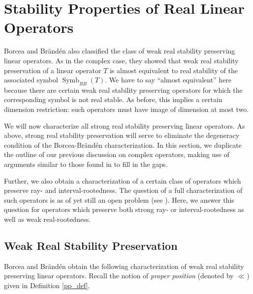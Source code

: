 \documentclass{article}
\theoremstyle{definition}
\theoremstyle{plain}
\DeclareMathOperator{\Symb}{Symb}
\begin{document}
\section{Stability Properties of Real Linear Operators}\label{Rops_sect}

Borcea and Br{\"a}nd{\'e}n also classified the class of weak real stability preserving linear operators. As in the complex case, they showed that weak real stability preservation of a linear operator $T$ is almost equivalent to real stability of the associated symbol $\Symb_{BB}(T)$. We have to say ``almost equivalent'' here because there are certain weak real stability preserving operators for which the corresponding symbol is not real stable. As before, this implies a certain dimension restriction: such operators must have image of dimension at most two.

We will now characterize all strong real stability preserving linear operators. As above, strong real stability preservation will serve to eliminate the degeneracy condition of the Borcea-Br{\"a}nd{\'e}n characterization. In this section, we duplicate the outline of our previous discussion on complex operators, making use of arguments similar to those found in \cite{bb1} to fill in the gaps.

Further, we also obtain a characterization of a certain class of operators which preserve ray- and interval-rootedness. The question of a full characterization of such operators is as of yet still an open problem (see \cite{bba}). Here, we answer this question for operators which preserve both strong ray- or interval-rootedness as well as weak real-rootedness.

\subsection{Weak Real Stability Preservation}

Borcea and Br{\"a}nd{\'e}n obtain the following characterization of weak real stability preserving linear operators. Recall the notion of \emph{proper position} (denoted by $\ll$) given in Definition \ref{pp_def}.
\end{document}
